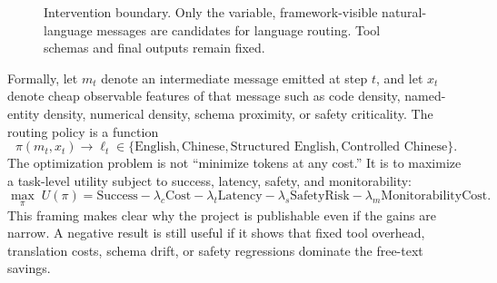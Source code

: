 \documentclass[11pt]{article}
\begin{document}
\begin{figure}[t]
\centering
{}
\caption{Intervention boundary. Only the variable, framework-visible natural-language messages are candidates for language routing. Tool schemas and final outputs remain fixed.}
\label{fig:boundary}
\end{figure}

Formally, let $m_t$ denote an intermediate message emitted at step $t$, and let $x_t$ denote cheap observable features of that message such as code density, named-entity density, numerical density, schema proximity, or safety criticality. The routing policy is a function
\[
\pi(m_t, x_t) \rightarrow \ell_t \in \{\text{English}, \text{Chinese}, \text{Structured English}, \text{Controlled Chinese}\}.
\]
The optimization problem is not ``minimize tokens at any cost.'' It is to maximize a task-level utility subject to success, latency, safety, and monitorability:
\[
\max_{\pi} \; U(\pi) = \mathrm{Success} - \lambda_c \mathrm{Cost} - \lambda_t \mathrm{Latency} - \lambda_s \mathrm{SafetyRisk} - \lambda_m \mathrm{MonitorabilityCost}.
\]
This framing makes clear why the project is publishable even if the gains are narrow. A negative result is still useful if it shows that fixed tool overhead, translation costs, schema drift, or safety regressions dominate the free-text savings.
\end{document}

